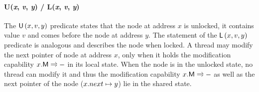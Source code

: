 \paragraph{\textsf{U}(\textit{x}, \textit{v}, \textit{y}) / \textsf{L}(\textit{x}, \textit{v}, \textit{y})}
The $\textsf{U}\left(x, v, y\right)$ predicate states that the node at address $x$ is unlocked, it contains value $v$ and comes before the node at address $y$. The statement of the $\textsf{L}\left(x, v, y\right)$ predicate is analogous and describes the node when locked.
%
%
A thread may modify the next pointer of node at address $x$, only when it holds the modification capability $\modC{x}$ in its local state. When the node is in the unlocked state, no thread can modify it and thus the modification capability $\modC{x}$ as well as the next pointer of the node ($x.next \mapsto y$) lie in the shared state. 
